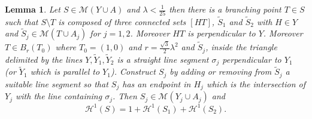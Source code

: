 \documentclass{article}
\renewcommand{\H}{\mathcal H}
\newcommand{\M}{\mathcal{M}}
\renewcommand{\H}{\mathcal{H}}
\newtheorem{lemma}[theorem]{Lemma}
\theoremstyle{definition}
\theoremstyle{remark}
\begin{document}
\begin{lemma}\label{lm:branching}
Let $S\in \M(Y\cup A)$
and $\lambda < \frac 1 {25}$ then
there is a branching point $T\in S$ 
such that $S\setminus T$ is composed of 
three connected sets $[HT]$, $\tilde S_1$ and $\tilde S_2$ 
with $H\in Y$ and  
$\tilde S_j \in \M(T\cup A_j)$ for $j=1,2$.
Moreover $HT$ is perpendicular to $Y$.
Moreover $T\in B_r(T_0)$
where $T_0=(1,0)$ and $r={\frac{\sqrt{3}}2\lambda^2}$
and $\tilde S_j$, inside the triangle delimited by the lines 
$Y,\tilde Y_1,\tilde Y_2$ is a straight line segment $\sigma_j$ perpendicular to 
$Y_1$ (or $\tilde Y_1$ which is parallel to $Y_1$).
Construct $S_j$ by adding or removing from $\tilde S_j$ 
a suitable line segment so that $S_j$ has an endpoint in $H_j$ 
which is the intersection of $Y_j$ with the line containing 
$\sigma_j$.
Then $S_j \in \M(Y_j\cup A_j)$ and 
\[
  \H^1(S) = 1 + \H^1(S_1) + \H^1(S_2).
\]
\end{lemma}
\end{document}
